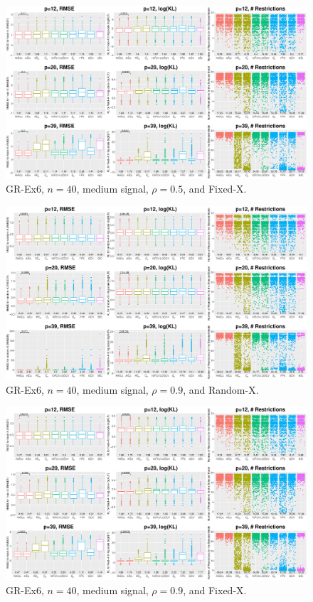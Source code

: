 \begin{figure}[!ht]
\centering
\includegraphics[width=\textwidth]{figures/supplement/fixedx_GR-Ex6_n40_msnr_rho05.eps}
\caption{GR-Ex6, $n=40$, medium signal, $\rho=0.5$, and Fixed-X.}
\end{figure}
\clearpage
\begin{figure}[!ht]
\centering
\includegraphics[width=\textwidth]{figures/supplement/randomx_GR-Ex6_n40_msnr_rho09.eps}
\caption{GR-Ex6, $n=40$, medium signal, $\rho=0.9$, and Random-X.}
\end{figure}
\begin{figure}[!ht]
\centering
\includegraphics[width=\textwidth]{figures/supplement/fixedx_GR-Ex6_n40_msnr_rho09.eps}
\caption{GR-Ex6, $n=40$, medium signal, $\rho=0.9$, and Fixed-X.}
\end{figure}
